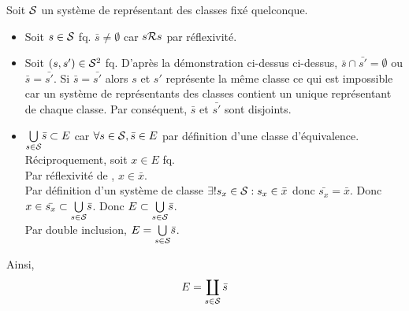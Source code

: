 \documentclass{article}
\begin{document}
\begin{question_kholle}
		Soit $\mathcal S$ un système de représentant des classes fixé quelconque.
		
		\begin{itemize}[label=\textemdash]
			\item Soit $s\in \mathcal S$ fq. $\bar{s} \neq \emptyset$ car $s \mathcal R s$ par réflexivité.
			\item Soit $(s, s') \in \mathcal S^2$ fq. D'après la démonstration ci-dessus ci-dessus, $\bar{s} \cap \bar{s'} = \emptyset$ ou $\bar{s} = \bar{s'}$. Si $\bar{s} = \bar{s'}$ alors $s$ et $s'$ représente la même classe ce qui est impossible car un système de représentants des classes contient un unique représentant de chaque classe. Par conséquent, $\bar{s}$ et $\bar{s'}$ sont disjoints.
			\item $\underset{s \in \mathcal S}{\bigcup} \bar{s} \subset E$ car $\forall s \in \mathcal S, \bar{s} \in E$ par définition d'une classe d'équivalence. \\
			Réciproquement, soit $x \in E$ fq. \\
			Par réflexivité de \Rel, $x \in \bar{x}$. \\
			Par définition d'un système de classe $\exists ! s_x \in \mathcal S : s_x \in \bar{x}$ donc $\bar{s_x} = \bar{x}$. Donc $x \in \bar{s_x} \subset \underset{s \in \mathcal S}{\bigcup} \bar{s}$. Donc $E \subset \underset{s \in \mathcal S}{\bigcup} \bar{s}$. \\
			Par double inclusion, $E = \underset{s \in \mathcal S}{\bigcup} \bar{s}$.			
		\end{itemize}
		
		Ainsi,
		\begin{equation}
			E = \coprod_{s \in \mathcal S} \bar{s}
		\end{equation}
		
	\end{question_kholle}
\end{document}
